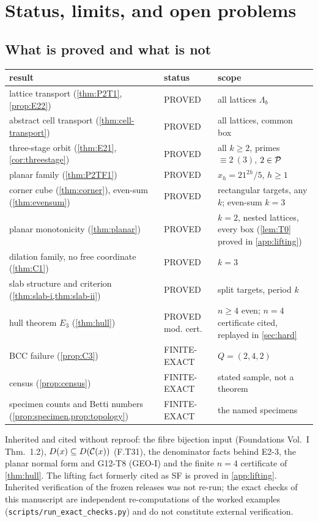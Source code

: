 \section{Status, limits, and open problems}\label{sec:open}
\subsection{What is proved and what is not}
\begin{center}\small
\begin{tabular}{@{}p{}p{}p{}@{}}\toprule
result & status & scope\\\midrule
lattice transport (\cref{thm:P2T1}, \cref{prop:E22}) & PROVED & all lattices $\Lambda_b$\\
abstract cell transport (\cref{thm:cell-transport}) & PROVED & all lattices, common box\\
three-stage orbit (\cref{thm:E21}, \cref{cor:threestage}) & PROVED & all $k\ge2$, primes $\equiv2\ (3)$, $2\in\mathcal P$\\
planar family (\cref{thm:P2TF1}) & PROVED & $x_h=21^{2h}/5$, $h\ge1$\\
corner cube (\cref{thm:corner}), even-sum (\cref{thm:evensum}) & PROVED & rectangular targets, any $k$; even-sum $k=3$\\
planar monotonicity (\cref{thm:planar}) & PROVED & $k=2$, nested lattices, every box (\cref{lem:T0} proved in \cref{app:lifting})\\
dilation family, no free coordinate (\cref{thm:C1}) & PROVED & $k=3$\\
slab structure and criterion (\cref{thm:slab-i,thm:slab-ii}) & PROVED & split targets, period $k$\\
hull theorem $E_3$ (\cref{thm:hull}) & PROVED mod. cert. & $n\ge4$ even; $n=4$ certificate \cite{HD1P4} cited, replayed in \cref{sec:hard}\\
BCC failure (\cref{prop:C3}) & FINITE-EXACT & $Q=(2,4,2)$\\
census (\cref{prop:census}) & FINITE-EXACT & stated sample, not a theorem\\
specimen counts and Betti numbers (\cref{prop:specimen,prop:topology}) & FINITE-EXACT & the named specimens\\\bottomrule
\end{tabular}
\end{center}
Inherited and cited without reproof: the fibre bijection input (Foundations Vol.~I Thm.~1.2), $D(x)\subseteq D(\mathcal C(x))$ (F.T31), the denominator facts behind E2-3, the planar normal form and G12-T8 (GEO-I) and the finite $n=4$ certificate of \cref{thm:hull}. The lifting fact formerly cited as SF is proved in \cref{app:lifting}. Inherited verification of the frozen releases was not re-run; the exact checks of this manuscript are independent re-computations of the worked examples (\texttt{scripts/run\_exact\_checks.py}) and do not constitute external verification.

